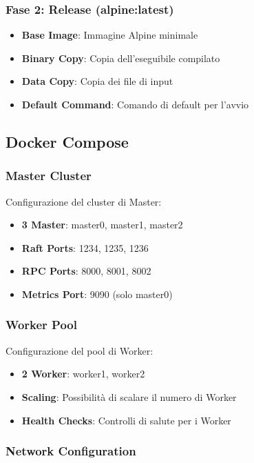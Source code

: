 \documentclass[12pt,a4paper]{article}
\begin{document}
\subsubsection{Fase 2: Release (alpine:latest)}

\begin{itemize}
\item \textbf{Base Image}: Immagine Alpine minimale
\item \textbf{Binary Copy}: Copia dell'eseguibile compilato
\item \textbf{Data Copy}: Copia dei file di input
\item \textbf{Default Command}: Comando di default per l'avvio
\end{itemize}

\subsection{Docker Compose}

\subsubsection{Master Cluster}

Configurazione del cluster di Master:

\begin{itemize}
\item \textbf{3 Master}: master0, master1, master2
\item \textbf{Raft Ports}: 1234, 1235, 1236
\item \textbf{RPC Ports}: 8000, 8001, 8002
\item \textbf{Metrics Port}: 9090 (solo master0)
\end{itemize}

\subsubsection{Worker Pool}

Configurazione del pool di Worker:

\begin{itemize}
\item \textbf{2 Worker}: worker1, worker2
\item \textbf{Scaling}: Possibilità di scalare il numero di Worker
\item \textbf{Health Checks}: Controlli di salute per i Worker
\end{itemize}

\subsubsection{Network Configuration}
\end{document}
